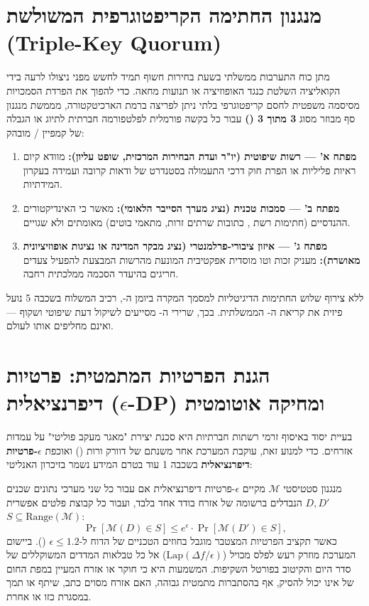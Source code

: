 \section{מנגנון החתימה הקריפטוגרפית המשולשת (Triple-Key Quorum)}
מתן כוח התערבות ממשלתי בשעת בחירות חשוף תמיד לחשש מפני ניצולו לרעה בידי הקואליציה השלטת כנגד האופוזיציה או תנועות מחאה. כדי להפוך את הפרדת הסמכויות מסיסמה משפטית לחסם קריפטוגרפי בלתי ניתן לפריצה ברמת הארכיטקטורה, מממשת  מנגנון סף מבוזר מסוג \textbf{3 מתוך 3 ()} עבור כל בקשה פורמלית לפלטפורמה חברתית לתיוג או הגבלה של קמפיין / מובהק:
\begin{enumerate}
    \item \textbf{מפתח א' — רשות שיפוטית (יו"ר ועדת הבחירות המרכזית, שופט עליון):} מוודא קיום ראיות פליליות או הפרת חוק דרכי התעמולה בסטנדרט של ודאות קרובה ועמידה בעקרון המידתיות.
    \item \textbf{מפתח ב' — סמכות טכנית (נציג מערך הסייבר הלאומי):} מאשר כי האינדיקטורים ההנדסיים (חתימות רשת , כתובות שרתים זרות, מתאמי בוטים) מאומתים ולא שגויים.
    \item \textbf{מפתח ג' — איזון ציבורי-פרלמנטרי (נציג מבקר המדינה או נציגות אופוזיציונית מאושרת):} מעניק זכות וטו מוסדית אפקטיבית המונעת מהרשות המבצעת להפעיל צעדים חריגים בהיעדר הסכמה ממלכתית רחבה.
\end{enumerate}
ללא צירוף שלוש החתימות הדיגיטליות למסמך המקרה ביומן ה-, רכיב המשלוח בשכבה 5 נועל פיזית את קריאת ה- הממשלתית. בכך, שרירי ה- מסייעים לשיקול דעת שיפוטי ושקוף — ואינם מחליפים אותו לעולם.

\section{הגנת הפרטיות המתמטית: פרטיות דיפרנציאלית ($\epsilon$-DP) ומחיקה אוטומטית}
בעיית יסוד באיסוף זרמי רשתות חברתיות היא סכנת יצירת "מאגר מעקב פוליטי" על עמדות אזרחים. כדי למנוע זאת, עוקבת המערכת אחר משנתם של דוורק ורות () \cite{dwork2014} ואוכפת \textbf{$\epsilon$-פרטיות דיפרנציאלית} בשכבה 1 עוד בטרם המידע נשמר בזיכרון האנליטי:

מנגנון סטטיסטי $\mathcal{M}$ מקיים $\epsilon$-פרטיות דיפרנציאלית אם עבור כל שני מערכי נתונים שכנים $D, D'$ הנבדלים ברשומה של אזרח בודד אחד בלבד, ועבור כל קבוצת פלטים אפשרית $S \subseteq \text{Range}(\mathcal{M})$:
\begin{equation}
    \Pr[\mathcal{M}(D) \in S] \le e^{\epsilon} \cdot \Pr[\mathcal{M}(D') \in S],
    \label{eq:epsilon_dp}
\end{equation}
כאשר תקציב הפרטיות המצטבר מוגבל בחוזים הטכניים של הדוח ל-$\epsilon \le 1.2$ (). ביישום המערכת מוזרק רעש לפלס מכויל ($\text{Lap}(\Delta f / \epsilon)$) אל כל טבלאות המדדים המשוקללים של סדר היום והקיטוב בפורטל השקיפות. המשמעות היא כי חוקר או אזרח המעיין במפת החום של  אינו יכול להסיק, אף בהסתברות מתמטית גבוהה, האם אזרח מסוים כתב, שיתף או תמך במסגרת כזו או אחרת.

